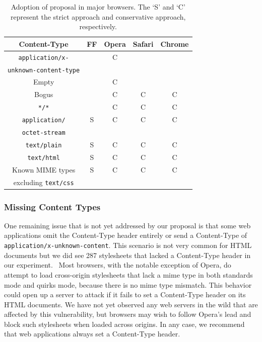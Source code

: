 \documentclass{acm_proc_article-sp}
\begin{document}
\begin{table}
\centering
\begin{tabular}{|c|c|c|c|c|} \hline
Content-Type&FF&Opera&Safari&Chrome\\ \hline
\texttt{application/x-}&&C&&\\ 
\texttt{unknown-content-type}&&&&\\ \hline
Empty&&C&&\\ \hline
Bogus&&C&C&C \\ \hline
\texttt{*/*}&&C&C&C \\ \hline
\texttt{application/}&S&C&C&C\\ 
\texttt{octet-stream}&&&&\\ \hline
\texttt{text/plain}&S&C&C&C\\ \hline
\texttt{text/html}&S&C&C&C\\ \hline
Known MIME types&S&C&C&C\\
excluding \texttt{text/css}&&&&\\
\hline\end{tabular}
\caption{Adoption of proposal in major browsers. The `S' and `C' represent the strict approach and conservative approach, respectively.}
\label{table:adoption}
\end{table}

\subsubsection{Missing Content Types}

One remaining issue that is not yet addressed by our proposal is that some web
applications omit the Content-Type header entirely or send a Content-Type of
\verb|application/x-unknown-content|. This scenario is not very common for
HTML documents but we did see 287 stylesheets that lacked a Content-Type
header in our experiment.~ Most browsers,
with the notable exception of Opera, do attempt to load cross-origin
stylesheets that lack a mime type in both standards mode and quirks mode,
because there is no mime type mismatch. This behavior could open up a server
to attack if it fails to set a Content-Type header on its HTML documents. We
have not yet observed any web servers in the wild that are affected by this
vulnerability, but browsers may wish to follow Opera's lead and block such
stylesheets when loaded across origins. In any case, we recommend that web
applications always set a Content-Type header.
\end{document}

